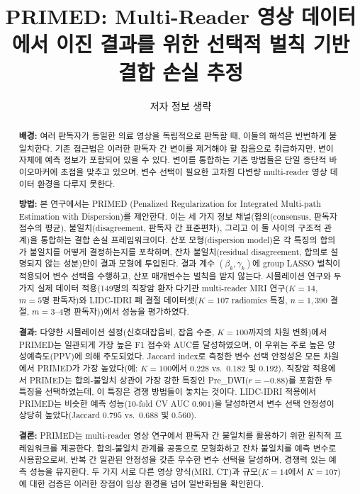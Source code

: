 \documentclass[a4paper,11pt]{article}
\title{PRIMED: Multi-Reader 영상 데이터에서 이진 결과를 위한 선택적 벌칙 기반 결합 손실 추정}
\author{저자 정보 생략}
\date{}
\begin{document}
\maketitle


\begin{abstract}

\noindent\textbf{배경:}
여러 판독자가 동일한 의료 영상을 독립적으로 판독할 때, 이들의 해석은 빈번하게 불일치한다.
기존 접근법은 이러한 판독자 간 변이를 제거해야 할 잡음으로 취급하지만, 변이 자체에 예측 정보가 포함되어 있을 수 있다.
변이를 통합하는 기존 방법들은 단일 종단적 바이오마커에 초점을 맞추고 있으며, 변수 선택이 필요한 고차원 다변량 multi-reader 영상 데이터 환경을 다루지 못한다.

\noindent\textbf{방법:}
본 연구에서는 PRIMED (Penalized Regularization for Integrated Multi-path Estimation with Dispersion)를 제안한다. 이는 세 가지 정보 채널(합의(consensus, 판독자 점수의 평균), 불일치(disagreement, 판독자 간 표준편차), 그리고 이 둘 사이의 구조적 관계)을 통합하는 결합 손실 프레임워크이다.
산포 모형(dispersion model)은 각 특징의 합의가 불일치를 어떻게 결정하는지를 포착하며, 잔차 불일치(residual disagreement, 합의로 설명되지 않는 성분)만이 결과 모형에 투입된다.
결과 계수 $(\beta_k, \gamma_k)$에 group LASSO 벌칙이 적용되어 변수 선택을 수행하고, 산포 매개변수는 벌칙을 받지 않는다.
시뮬레이션 연구와 두 가지 실제 데이터 적용(149명의 직장암 환자 다기관 multi-reader MRI 연구($K = 14$, $m = 5$명 판독자)와 LIDC-IDRI 폐 결절 데이터셋($K = 107$ radiomics 특징, $n = 1{,}390$ 결절, $m = 3$--$4$명 판독자))에서 성능을 평가하였다.

\noindent\textbf{결과:}
다양한 시뮬레이션 설정(신호대잡음비, 잡음 수준, $K = 100$까지의 차원 변화)에서 PRIMED는 일관되게 가장 높은 F1 점수와 AUC를 달성하였으며, 이 우위는 주로 높은 양성예측도(PPV)에 의해 주도되었다.
Jaccard index로 측정한 변수 선택 안정성은 모든 차원에서 PRIMED가 가장 높았다(예: $K = 100$에서 $0.228$ vs.\ $0.182$ 및 $0.192$).
직장암 적용에서 PRIMED는 합의-불일치 상관이 가장 강한 특징인 Pre\_DWI($r = -0.88$)를 포함한 두 특징을 선택하였는데, 이 특징은 경쟁 방법들이 놓치는 것이다.
LIDC-IDRI 적용에서 PRIMED는 비슷한 예측 성능(10-fold CV AUC $0.901$)을 달성하면서 변수 선택 안정성이 상당히 높았다(Jaccard $0.795$ vs.\ $0.688$ 및 $0.560$).

\noindent\textbf{결론:}
PRIMED는 multi-reader 영상 연구에서 판독자 간 불일치를 활용하기 위한 원칙적 프레임워크를 제공한다.
합의-불일치 관계를 공동으로 모형화하고 잔차 불일치를 예측 변수로 사용함으로써, 반복 간 일관된 안정성을 갖춘 우수한 변수 선택을 달성하며, 경쟁력 있는 예측 성능을 유지한다.
두 가지 서로 다른 영상 양식(MRI, CT)과 규모($K = 14$에서 $K = 107$)에 대한 검증은 이러한 장점이 임상 환경을 넘어 일반화됨을 확인한다.
\end{abstract}
\end{document}
